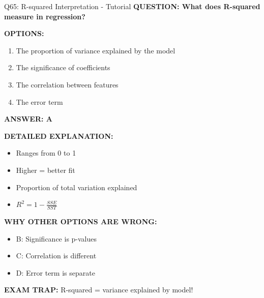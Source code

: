 \documentclass[8pt]{beamer}
\begin{document}
	\begin{frame}{Q65: R-squared Interpretation - Tutorial}
		\fontsize{6.5}{7.5}\selectfont
		\textbf{QUESTION: What does R-squared measure in regression?}
		
		\vspace{0.1cm}
		\textbf{OPTIONS:}
		\begin{enumerate}
			\item The proportion of variance explained by the model
			\item The significance of coefficients
			\item The correlation between features
			\item The error term
		\end{enumerate}
		
		\vspace{0.1cm}
		\textcolor{myblue}{\textbf{ANSWER: A}}
		
		\vspace{0.1cm}
		\textbf{DETAILED EXPLANATION:}
		\begin{itemize}
			\item Ranges from 0 to 1
			\item Higher = better fit
			\item Proportion of total variation explained
			\item $R^2 = 1 - \frac{SSE}{SST}$
		\end{itemize}
		
		\vspace{0.1cm}
		\textcolor{myred}{\textbf{WHY OTHER OPTIONS ARE WRONG:}}
		\begin{itemize}
			\item \textcolor{myred}{B:} Significance is p-values
			\item \textcolor{myred}{C:} Correlation is different
			\item \textcolor{myred}{D:} Error term is separate
		\end{itemize}
		
		\textcolor{myred}{\textbf{EXAM TRAP:}} R-squared = \textcolor{myblue}{variance explained by model}!
	\end{frame}
	
\end{document}
